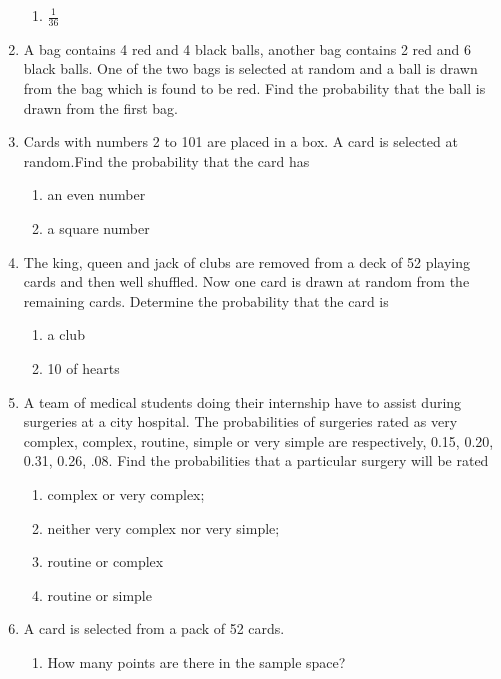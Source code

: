 \begin{enumerate}[label=\thesection.\arabic*,ref=\thesection.\theenumi]
\begin{enumerate}
    \item $\frac{1}{36}$ 
\end{enumerate}
\solution
	\item A bag contains 4 red and 4 black balls, another bag contains 2 red and 6 black balls. One of the two bags is selected at random and a ball is drawn from the bag which is found to be red. Find the probability that the ball is drawn from the first bag.
\\
\solution
  \item
  Cards with numbers 2 to 101 are placed in a box. A card is selected at random.Find the probability that the card has
\begin{enumerate}[label=(\roman*)]
	\item an even number 
	\item a square number
\end{enumerate}
\solution
%
\item
The king, queen and jack of clubs are removed from a deck of 52 playing cards and then well shuffled. Now one card is drawn at random from the remaining cards.  Determine the probability that the card is
\begin{enumerate}[label=(\roman*)]
\item a club
\item 10 of hearts
\end{enumerate}
\solution
%
\item A team of medical students doing their internship have to assist during surgeries
at a city hospital. The probabilities of surgeries rated as very complex, complex,
routine, simple or very simple are respectively, 0.15, 0.20, 0.31, 0.26, .08. Find
the probabilities that a particular surgery will be rated
\begin{enumerate}
	\item complex or very complex;
	\item neither very complex nor very simple;
	\item routine or complex
	\item routine or simple
\end{enumerate}
\solution
%
\item A card is selected from a pack of 52 cards.
\begin{enumerate}[label=(\alph*)]
    \item How many points are there in the sample space?

\end{enumerate}
\end{enumerate}
